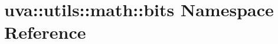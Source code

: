 \hypertarget{namespaceuva_1_1utils_1_1math_1_1bits}{}\section{uva\+:\+:utils\+:\+:math\+:\+:bits Namespace Reference}
\label{namespaceuva_1_1utils_1_1math_1_1bits}
